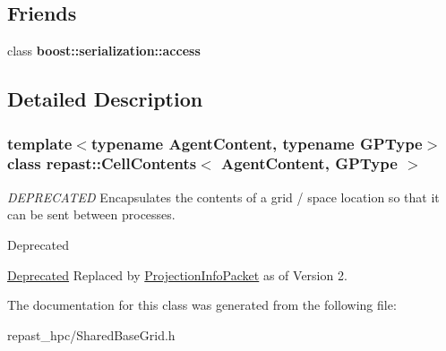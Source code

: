 \subsection*{Friends}
\begin{DoxyCompactItemize}
\item 
\hypertarget{classrepast_1_1_cell_contents_ac98d07dd8f7b70e16ccb9a01abf56b9c}{class {\bfseries boost\-::serialization\-::access}}\label{classrepast_1_1_cell_contents_ac98d07dd8f7b70e16ccb9a01abf56b9c}

\end{DoxyCompactItemize}


\subsection{Detailed Description}
\subsubsection*{template$<$typename Agent\-Content, typename G\-P\-Type$>$class repast\-::\-Cell\-Contents$<$ Agent\-Content, G\-P\-Type $>$}

{\itshape D\-E\-P\-R\-E\-C\-A\-T\-E\-D} Encapsulates the contents of a grid / space location so that it can be sent between processes. 

\begin{DoxyRefDesc}{Deprecated}
\item[\hyperlink{deprecated__deprecated000001}{Deprecated}]Replaced by \hyperlink{classrepast_1_1_projection_info_packet}{Projection\-Info\-Packet} as of Version 2. \end{DoxyRefDesc}


The documentation for this class was generated from the following file\-:\begin{DoxyCompactItemize}
\item 
repast\-\_\-hpc/Shared\-Base\-Grid.\-h\end{DoxyCompactItemize}
